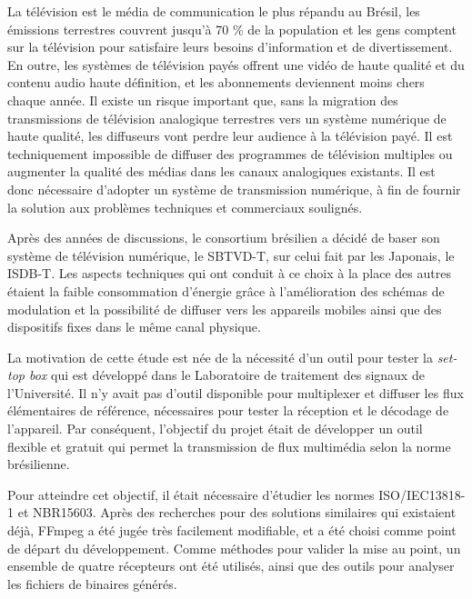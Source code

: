 \documentclass[12pt,a4paper]{article}
\begin{document}
La télévision est le média de communication le plus répandu au Brésil, les émissions terrestres couvrent jusqu'à 70 \% de la population et les gens comptent sur la télévision pour satisfaire leurs besoins d'information et de divertissement. En outre, les systèmes de télévision payés offrent une vidéo de haute qualité et du contenu audio haute définition, et les abonnements deviennent moins chers chaque année. Il existe un risque important que, sans la migration des transmissions de télévision analogique terrestres vers un système numérique de haute qualité, les diffuseurs vont perdre leur audience à la télévision payé. Il est techniquement impossible de diffuser des programmes de télévision multiples ou augmenter la qualité des médias dans les canaux analogiques existants. Il est donc nécessaire d'adopter un système de transmission numérique, à fin de fournir la solution aux problèmes techniques et commerciaux soulignés.

Après des années de discussions, le consortium brésilien a décidé de baser son système de télévision numérique, le SBTVD-T, sur celui fait par les Japonais, le ISDB-T. Les aspects techniques qui ont conduit à ce choix à la place des autres étaient la faible consommation d'énergie grâce à l'amélioration des schémas de modulation et la possibilité de diffuser vers les appareils mobiles ainsi que des dispositifs fixes dans le même canal physique.

La motivation de cette étude est née de la nécessité d'un outil pour tester la \textit{set-top box} qui est développé dans le Laboratoire de traitement des signaux de l'Université. Il n'y avait pas d'outil disponible pour multiplexer et diffuser les flux élémentaires de référence, nécessaires pour tester la réception et le décodage de l'appareil. Par conséquent, l'objectif du projet était de développer un outil flexible et gratuit qui permet la transmission de flux multimédia selon la norme brésilienne.

Pour atteindre cet objectif, il était nécessaire d'étudier les normes ISO/IEC13818-1 et NBR15603. Après des recherches pour des solutions similaires qui existaient déjà, FFmpeg a été jugée très facilement modifiable, et a été choisi comme point de départ du développement. Comme méthodes pour valider la mise au point, un ensemble de quatre récepteurs ont été utilisés, ainsi que des outils pour analyser les fichiers de binaires générés.
\end{document}
